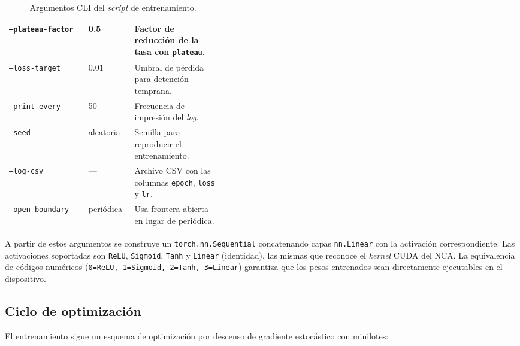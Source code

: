 \begin{table}[H]
\begin{tabular}{l|l|p{0.42\linewidth}}
        \texttt{--plateau-factor} & 0.5 & Factor de reducción de la tasa con \texttt{plateau}. \\ \hline
        \texttt{--loss-target} & 0.01 & Umbral de pérdida para detención temprana. \\ \hline
        \texttt{--print-every} & 50 & Frecuencia de impresión del \textit{log}. \\ \hline
        \texttt{--seed} & aleatoria & Semilla para reproducir el entrenamiento. \\ \hline
        \texttt{--log-csv} & --- & Archivo CSV con las columnas \texttt{epoch}, \texttt{loss} y \texttt{lr}. \\ \hline
        \texttt{--open-boundary} & periódica & Usa frontera abierta en lugar de periódica. \\ \hline
    \end{tabular}
    \caption{Argumentos CLI del \textit{script} de entrenamiento.}
    \label{tab:cli-entrenamiento}
\end{table}

A partir de estos argumentos se construye un \texttt{torch.nn.Sequential} concatenando capas \texttt{nn.Linear} con la activación correspondiente. Las activaciones soportadas son \texttt{ReLU}, \texttt{Sigmoid}, \texttt{Tanh} y \texttt{Linear} (identidad), las mismas que reconoce el \textit{kernel} CUDA del NCA. La equivalencia de códigos numéricos (\texttt{0=ReLU, 1=Sigmoid, 2=Tanh, 3=Linear}) garantiza que los pesos entrenados sean directamente ejecutables en el dispositivo.

\subsection{Ciclo de optimización}

El entrenamiento sigue un esquema de optimización por descenso de gradiente estocástico con minilotes:

